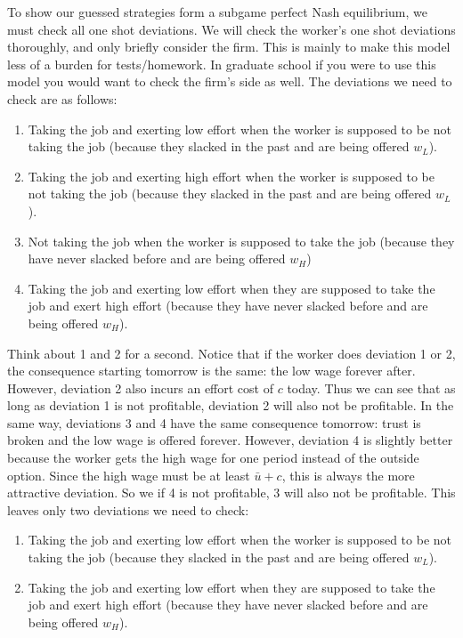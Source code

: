 \documentclass[14pt]{article}
\begin{document}
To show our guessed strategies form a subgame perfect Nash equilibrium, we must check all one shot deviations. We will check the worker's one shot deviations thoroughly, and only briefly consider the firm. This is mainly to make this model less of a burden for tests/homework. In graduate school if you were to use this model you would want to check the firm's side as well. The deviations we need to check are as follows:

\begin{enumerate}
    \item Taking the job and exerting low effort when the worker is supposed to be not taking the job (because they slacked in the past and are being offered $w_L$).
    \item Taking the job and exerting high effort when the worker is supposed to be not taking the job (because they slacked in the past and are being offered $w_L$).
    \item Not taking the job when the worker is supposed to take the job (because they have never slacked before and are being offered $w_H$)
    \item Taking the job and exerting low effort when they are supposed to take the job and exert high effort (because they have never slacked before and are being offered $w_H$).
\end{enumerate}

Think about 1 and 2 for a second. Notice that if the worker does deviation 1 or 2, the consequence starting tomorrow is the same: the low wage forever after. However, deviation 2 also incurs an effort cost of $c$ today. Thus we can see that as long as deviation 1 is not profitable, deviation 2 will also not be profitable. In the same way, deviations 3 and 4 have the same consequence tomorrow: trust is broken and the low wage is offered forever. However, deviation 4 is slightly better because the worker gets the high wage for one period instead of the outside option. Since the high wage must be at least $\bar u +c$, this is always the more attractive deviation. So we if 4 is not profitable, 3 will also not be profitable. This leaves only two deviations we need to check:

\begin{enumerate}
    \item Taking the job and exerting low effort when the worker is supposed to be not taking the job (because they slacked in the past and are being offered $w_L$).
    \item Taking the job and exerting low effort when they are supposed to take the job and exert high effort (because they have never slacked before and are being offered $w_H$).
\end{enumerate}
\end{document}
